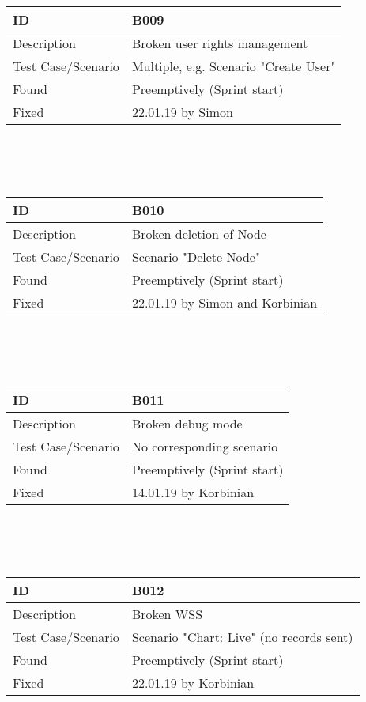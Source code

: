 \documentclass{scrreprt}
\begin{document}
\\ \\ \\
\begin{tabularx}{12cm}{l|X}
ID					& B009  \\
\hline
Description 		& 
Broken user rights management \\
\hline
Test Case/Scenario	& Multiple, e.g. Scenario "Create User"\\
\hline
Found				&  	Preemptively (Sprint start)\\
\hline
Fixed				&  22.01.19 by Simon \\ 
\end{tabularx}
\\ \\ \\
\begin{tabularx}{12cm}{l|X}
ID					& B010  \\
\hline
Description 		& 
Broken deletion of Node \\
\hline
Test Case/Scenario	& Scenario "Delete Node" \\
\hline
Found				&  	Preemptively (Sprint start)\\
\hline
Fixed				&   22.01.19 by Simon and Korbinian \\ 
\end{tabularx}
\\ \\ \\
\begin{tabularx}{12cm}{l|X}
ID					& B011  \\
\hline
Description 		& 
Broken debug mode \\
\hline
Test Case/Scenario	& No corresponding scenario  \\
\hline
Found				&  	Preemptively (Sprint start)\\
\hline
Fixed				&   14.01.19 by Korbinian \\ 
\end{tabularx}
\\ \\ \\
\begin{tabularx}{12cm}{l|X}
ID					& B012  \\
\hline
Description 		& 
Broken WSS \\
\hline
Test Case/Scenario	& Scenario "Chart: Live" (no records sent) \\
\hline
Found				&  	Preemptively (Sprint start)\\
\hline
Fixed				&   22.01.19 by Korbinian \\ 
\end{tabularx}
\end{document}

